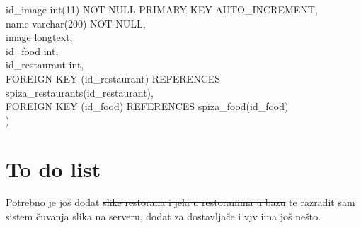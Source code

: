 \documentclass[12pt]{scrartcl}
\begin{document}
\begin{itemize}
    id\_image int(11) NOT NULL PRIMARY KEY AUTO\_INCREMENT,\\
    name varchar(200) NOT NULL,\\
    image longtext,\\
    id\_food int,\\
    id\_restaurant int,\\
    FOREIGN KEY (id\_restaurant) REFERENCES spiza\_restaurants(id\_restaurant),\\
    FOREIGN KEY (id\_food) REFERENCES spiza\_food(id\_food)\\
    )
\end{itemize}

\section{To do list}
Potrebno je još dodat \st{slike restorana i jela u restoranima u bazu} te razradit sam sistem čuvanja slika na serveru, dodat za dostavljače i vjv ima još nešto. 
\end{document}
